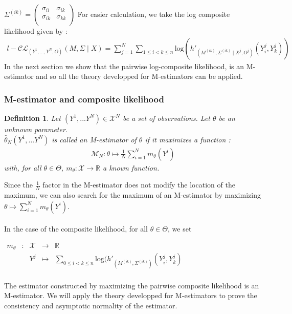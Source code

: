 \documentclass[11pt, a4paper]{article}
\newtheorem{definition}{Definition}
\begin{document}
$\Sigma^{(ik)}  = \begin{pmatrix}
\sigma_{ii} & \sigma_{ik}\\
\sigma_{ik} & \sigma_{kk}\\
\end{pmatrix}$
For easier calculation, we take the log composite likelihood given by :
\begin{align*}
l-\mathcal{CL}_{(Y^1,...,Y^N,O)}(M,\Sigma \mid X) = \sum_{j=1}^N \sum_{1 \leq i < k \leq n}  \mathrm{log}(h'_{(M^{(ik)},\Sigma^{(ik)} \mid X^j,O^j)}(Y^j_i,Y^j_k))
\end{align*}
 In the next section we show that the pairwise log-composite likelihood, is an M-estimator and so all the theory developped for M-estimators \cite{vaart_1998} can be applied.
\subsubsection{M-estimator and composite likelihood}
\begin{definition}
Let $(Y^1,...Y^N) \in \mathcal{X}^N$ be a set of observations. Let $\theta$ be an unknown parameter. \\
$\widehat{\theta}_N(Y^1,...Y^N)$ is called an M-estimator of $\theta$ if it maximizes a function :
\begin{align*}
\mathcal{M}_N : \theta \mapsto \frac{1}{N} \sum_{i=1}^N m_\theta(Y^i)
\end{align*}
with, for all $\theta \in \Theta$, $m_\theta : \mathcal{X} \rightarrow \mathbb{R}$ a known function.
\end{definition}
Since the $\frac{1}{N}$ factor in the M-estimator does not modify the location of the maximum, we can also search for the maximum of an M-estimator by maximizing  $ \theta \mapsto  \sum_{i=1}^N m_\theta(Y^i)$.\\
\\
In the case of the composite likelihood, for all $\theta \in \Theta$, we set 
\begin{center}
$\begin{array}{ccccc}
m_\theta & : & \mathcal{X} & \to & \mathbb{R} \\
 & & Y^j & \mapsto & \sum_{0 \leq i<k \leq n} \mathrm{log} (h'_{(M^{(ik)},\Sigma^{(ik)})}(Y^j_i,Y^j_k) \\
\end{array}$
\end{center}
The estimator constructed by maximizing the pairwise composite likelihood is an M-estimator. We will apply the theory developped for M-estimators to prove the consistency and asymptotic normality of the estimator.
\end{document}
